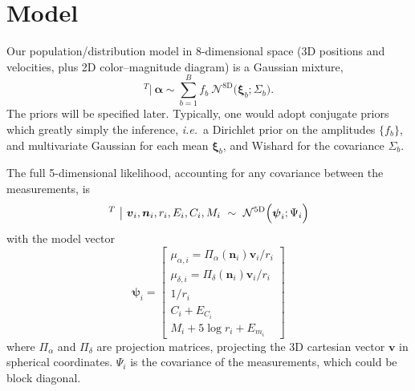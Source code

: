 \documentclass{article}
\newcommand{\ie}{{\textit{i.e.}~}}
\newcommand{\equ}[1]{\begin{equation}#1\end{equation}}
\newcommand{\eqn}[1]{\begin{eqnarray}#1\end{eqnarray}}
\renewcommand{\vec}[1]{\boldsymbol{#1}}
\begin{document}
\section{Model}

Our population/distribution model in 8-dimensional space (3D positions and velocities, plus 2D color--magnitude diagram) is a Gaussian mixture,
\equ{
	[ \vec{v} \ \vec{n} \ r \ C \ M  ]^T \bigl\vert \ \vec{\alpha} \sim \sum_{b=1}^B f_b \ \mathcal{N}^\mathrm{8D}\bigl(  \vec{\xi}_b; \Sigma_b\bigr)  .
}	
The priors will be specified later. Typically, one would adopt conjugate priors which greatly simply the inference, \ie a Dirichlet prior on the amplitudes $\{ f_b\}$, and multivariate Gaussian for each mean $ \vec{\xi}_b$, and Wishard for the covariance $\Sigma_b$.

The full 5-dimensional likelihood, accounting for any covariance between the measurements, is
\eqn{
	[\hat{\mu}_{\alpha, i} \ \hat{\mu}_{\delta, i} \ \hat{\varpi}_i \ \hat{C}_i \ \hat{m}_i ]^T \ \bigl\vert \ \vec{v}_i, \vec{n}_i, r_i, E_i, C_i, M_i	\ \sim \ \mathcal{N}^\mathrm{5D}\Bigl( \vec{\psi}_i; \Psi_i \Bigr)
}
with the model vector
\equ{
	\vec{\psi}_i = \begin{bmatrix} 
		\mu_{\alpha, i}	=	\Pi_\alpha(\vec{n}_i) \vec{v}_i / r_i	\\ 
		\mu_{\delta, i}	=	\Pi_\delta(\vec{n}_i) \vec{v}_i / r_i	\\ 
		1/r_i	\\
		C_i+E_{C_i}	\\
		M_i + 5\log r_i +E_{m_i}
	\end{bmatrix}
}
where $\Pi_\alpha$ and $\Pi_\delta$ are projection matrices, projecting the 3D cartesian vector $\vec{v}$ in spherical coordinates.
$\Psi_i$ is the covariance of the measurements, which could be block diagonal.
\end{document}
